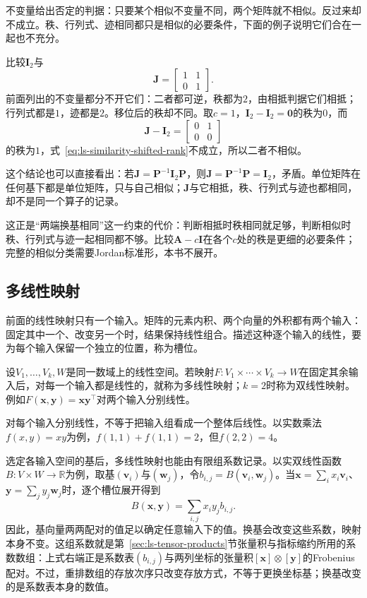 不变量给出否定的判据：只要某个相似不变量不同，两个矩阵就不相似。反过来却不成立。秩、行列式、迹相同都只是相似的必要条件，下面的例子说明它们合在一起也不充分。
\begin{example}[反例：相抵而不相似的两个矩阵]
\label{ex:ls-equivalent-not-similar}
比较$\bm I_2$与
\[
 \bm J=\begin{bmatrix}1&1\\0&1\end{bmatrix}.
\]
前面列出的不变量都分不开它们：二者都可逆，秩都为$2$，由相抵判据它们相抵；行列式都是$1$，迹都是$2$。移位后的秩却不同。取$c=1$，$\bm I_2-\bm I_2=\bm0$的秩为$0$，而
\[
 \bm J-\bm I_2=\begin{bmatrix}0&1\\0&0\end{bmatrix}
\]
的秩为$1$，式~\eqref{eq:ls-similarity-shifted-rank}不成立，所以二者不相似。

这个结论也可以直接看出：若$\bm J=\bm P^{-1}\bm I_2\bm P$，则$\bm J=\bm P^{-1}\bm P=\bm I_2$，矛盾。单位矩阵在任何基下都是单位矩阵，只与自己相似；$\bm J$与它相抵，秩、行列式与迹也都相同，却不是同一个算子的记录。
\end{example}
这正是“两端换基相同”这一约束的代价：判断相抵时秩相同就足够，判断相似时秩、行列式与迹一起相同都不够。比较$\bm A-c\bm I$在各个$c$处的秩是更细的必要条件；完整的相似分类需要Jordan标准形，本书不展开。

\subsection{多线性映射}
\label{sec:ls-multilinear-maps}

前面的线性映射只有一个输入。矩阵的元素内积、两个向量的外积都有两个输入：固定其中一个、改变另一个时，结果保持线性组合。描述这种逐个输入的线性，要为每个输入保留一个独立的位置，称为槽位。

设$V_1,\ldots,V_k,W$是同一数域上的线性空间。若映射$F:V_1\times\cdots\times V_k\to W$在固定其余输入后，对每一个输入都是线性的，就称为多线性映射；$k=2$时称为双线性映射。例如$F(\bm x,\bm y)=\bm x\bm y^\top$对两个输入分别线性。

对每个输入分别线性，不等于把输入组看成一个整体后线性。以实数乘法$f(x,y)=xy$为例，$f(1,1)+f(1,1)=2$，但$f(2,2)=4$。

选定各输入空间的基后，多线性映射也能由有限组系数记录。以实双线性函数$B:V\times W\to\mathbb R$为例，取基$(\bm v_i)$与$(\bm w_j)$，令$b_{i,j}=B(\bm v_i,\bm w_j)$。当$\bm x=\sum_i x_i\bm v_i$、$\bm y=\sum_j y_j\bm w_j$时，逐个槽位展开得到
\[
 B(\bm x,\bm y)=\sum_{i,j}x_i y_j b_{i,j}.
\]
因此，基向量两两配对的值足以确定任意输入下的值。换基会改变这些系数，映射本身不变。这组系数就是第~\ref{sec:ls-tensor-products}节张量积与指标缩约所用的系数数组：上式右端正是系数表$(b_{i,j})$与两列坐标的张量积$[\bm x]\otimes[\bm y]$的Frobenius配对。不过，重排数组的存放次序只改变存放方式，不等于更换坐标基；换基改变的是系数表本身的数值。
